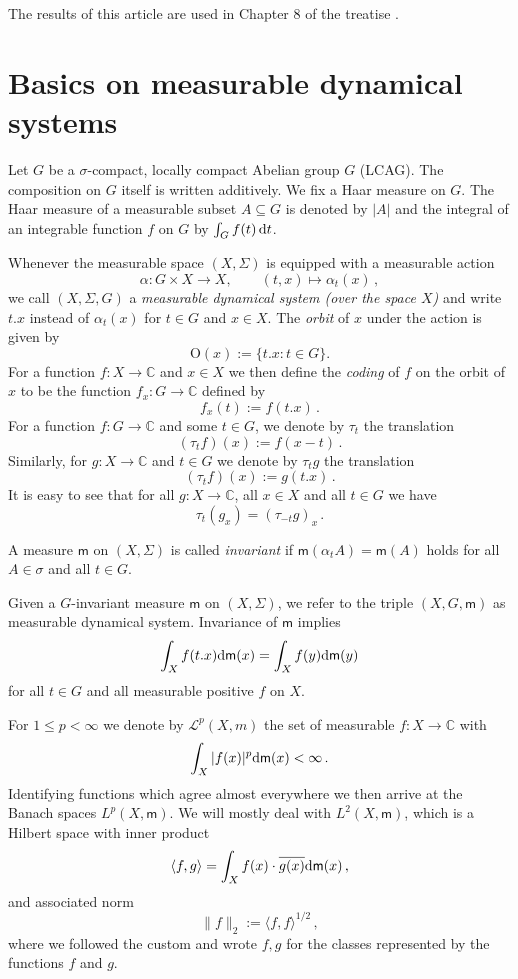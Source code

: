 \documentclass [14pt]{amsart}
\numberwithin{equation}{section}
\newcommand{\CC}{{\mathbb C}}
\newcommand{\mm}{\mathsf{m}}
\newcommand{\dd}{\mbox{\rm d}}
\begin{document}
The results of this article are used in Chapter 8 of the treatise \cite{LSS}.


\section{Basics on  measurable dynamical systems}\label{sec-Basics}
Let $G$ be a $\sigma$-compact, locally compact Abelian
group $G$ (LCAG). The composition
on $G$ itself is written additively. We fix a Haar measure  on $G$. The Haar measure
of a measurable subset $A \subseteq  G$ is denoted by $|A|$ and the
integral of an integrable function $f$ on $G$ by $\int_{G} f(t)\, \dd t$.


Whenever the measurable  space $(X,\Sigma)$ is equipped with a measurable action
$$
\alpha: G\times X\longrightarrow X , \qquad (t,x)\mapsto
\alpha_t (x) \,,
$$
we call $(X,\Sigma, G)$ a \textit{measurable dynamical system (over the
space $X$)} and  write $t.x$
instead of $\alpha_t (x)$ for $t\in G$ and $x\in X$.
The \textit{orbit} of $x$ under the action is given by
$$\mbox{O}(x) :=\{ t.x : t\in G\}.$$
For a function $f : X\longrightarrow \CC$  and $x\in X$ we then define the \textit{coding} of $f$ on the orbit of $x$ to be the function
$f_x : G\longrightarrow \CC$ defined by
\[
f_x (t):= f(t.x) \,.
\]
For a function $f : G \to \CC$ and some $t \in G$, we denote by $\tau_t$ the translation
\[
(\tau_tf)(x):= f(x-t) \,.
\]
Similarly, for $g: X \to \CC$ and $t \in G$ we denote by
$\tau_t g$ the translation
\[
(\tau_tf)(x):= g(t.x) \,.
\]
It is easy to see that for all $g: X \to \CC$, all $x \in X$ and all $t \in G$ we have
\[
\tau_t(g_x)= (\tau_{-t}g)_x \,.
\]

A measure  $\mm$ on $(X,\Sigma)$ is called \textit{invariant} if $\mm(\alpha_{t} A) = \mm(A)$ holds for all $A\in \sigma$ and all $t\in G$.

Given a $G$-invariant measure $\mm$ on $(X, \Sigma)$, we refer to the triple  $(X,G,\mm)$ as measurable dynamical system.
Invariance of $\mm$  implies
$$\int_X f(t.x)\dd \mm(x) = \int_X f(y) \dd \mm(y)$$
for all $t\in G$ and all measurable positive $f$ on $X$.

For $1\leq p <\infty$ we denote by $\mathcal{L}^p (X,m)$ the set of measurable $f : X\longrightarrow \CC$ with
$$\int_X |f(x)|^p \dd \mm(x) <\infty \,.
$$
Identifying functions which agree almost everywhere we then arrive at the Banach spaces $L^p (X,\mm)$. We will mostly deal with $L^2 (X,\mm)$, which is a Hilbert space with inner product
$$\langle f,g\rangle =\int_X f(x) \cdot \overline{g(x)} \dd \mm(x) \,,$$
and associated norm
$$\|f\|_2:= \langle f, f\rangle^{1/2} \,,$$
where we followed the custom and wrote $f,g$ for the classes represented by the functions $f$ and $g$.
\end{document}
